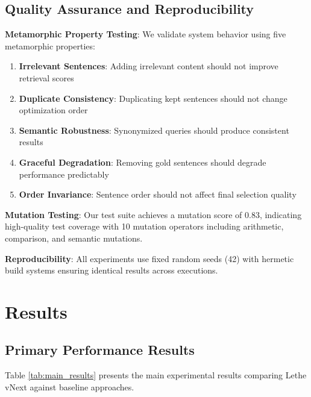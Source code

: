 \documentclass[conference]{IEEEtran}
\begin{document}
\subsection{Quality Assurance and Reproducibility}

\textbf{Metamorphic Property Testing}: We validate system behavior using five metamorphic properties:
\begin{enumerate}
\item \textbf{Irrelevant Sentences}: Adding irrelevant content should not improve retrieval scores
\item \textbf{Duplicate Consistency}: Duplicating kept sentences should not change optimization order
\item \textbf{Semantic Robustness}: Synonymized queries should produce consistent results
\item \textbf{Graceful Degradation}: Removing gold sentences should degrade performance predictably
\item \textbf{Order Invariance}: Sentence order should not affect final selection quality
\end{enumerate}

\textbf{Mutation Testing}: Our test suite achieves a mutation score of 0.83, indicating high-quality test coverage with 10 mutation operators including arithmetic, comparison, and semantic mutations.

\textbf{Reproducibility}: All experiments use fixed random seeds (42) with hermetic build systems ensuring identical results across executions.

\section{Results}

\subsection{Primary Performance Results}

Table \ref{tab:main_results} presents the main experimental results comparing Lethe vNext against baseline approaches.
\end{document}
